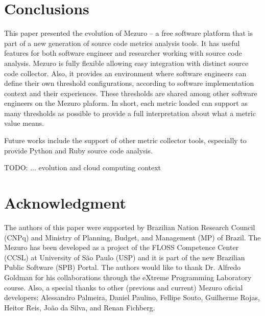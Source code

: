 \section{Conclusions}
\label{sec:conclusions}


This paper presented the evolution of Mezuro -- a free software platform that
is part of a new generation of source code metrics analysis tools.  It has
useful features for both software engineer and researcher working with source
code analysis. Mezuro is fully flexible allowing easy integration with distinct
source code collector. Also, it provides an environment where software
engineers can define their own threshold configurations, according to software
implementation context and their experiences. These thresholds are shared among
other software engineers on the Mezuro plaform.  In short, each metric loaded
can support as many thresholds as possible to provide a full interpretation
about what a metric value means.

Future works include the support of other metric collector tools, especially
to provide Python and Ruby source code analysis.

TODO: ... evolution and cloud computing context

\section*{Acknowledgment}

The authors of this paper were supported by Brazilian Nation Research Council
(CNPq) and Ministry of Planning, Budget, and Management (MP) of Brazil. 
%
The Mezuro has been developed as a project of the FLOSS Competence Center
(CCSL) at University of São Paulo (USP) and it is part of the new Brazilian
Public Software (SPB) Portal.
%
The authors would like to thank Dr. Alfredo Goldman for his collaborations
through the eXtreme Programming Laboratory course.
%
Also, a special thanks to other (previous and current) Mezuro oficial developers:
Alessandro Palmeira,
Daniel Paulino,
Fellipe Souto,
Guilherme Rojas,
Heitor Reis,
João da Silva, and
Renan Fichberg.
